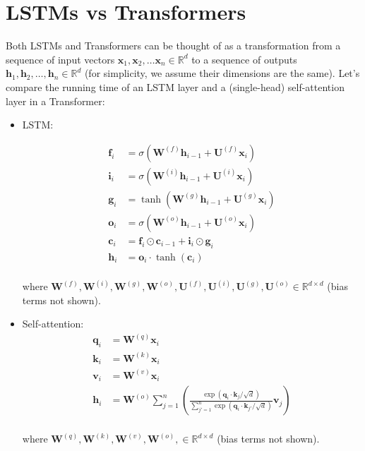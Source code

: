 \documentclass[11pt, letterpaper]{article}
\begin{document}
\newpage

\section{LSTMs vs Transformers}

Both LSTMs and Transformers can be thought of as a transformation from a sequence of input vectors $\textbf{x}_1, \textbf{x}_2, \dots \textbf{x}_n \in \mathbb{R}^d$ to a sequence of outputs $\textbf{h}_1, \textbf{h}_2, \dots, \textbf{h}_n \in \mathbb{R}^d$ (for simplicity, we assume their dimensions are the same). Let's compare the running time of an LSTM layer and a (single-head) self-attention layer in a Transformer:

\begin{itemize}
    \item LSTM:

    $$\begin{aligned}
        \mathbf{f}_i &= \sigma(\mathbf{W}^{(f)}\mathbf{h}_{i-1} + \mathbf{U}^{(f)}\mathbf{x}_i)\\
        \mathbf{i}_i &= \sigma(\mathbf{W}^{(i)}\mathbf{h}_{i-1} + \mathbf{U}^{(i)}\mathbf{x}_i)\\
        \mathbf{g}_i &= \tanh(\mathbf{W}^{(g)}\mathbf{h}_{i-1} + \mathbf{U}^{(g)}\mathbf{x}_i)\\
        \mathbf{o}_i &= \sigma(\mathbf{W}^{(o)}\mathbf{h}_{i-1} + \mathbf{U}^{(o)}\mathbf{x}_i)\\
        \mathbf{c}_i &= \mathbf{f}_i \odot \mathbf{c}_{i-1} + \mathbf{i}_i \odot \mathbf{g}_i\\
        \mathbf{h}_i &= \mathbf{o}_i \cdot \tanh(\mathbf{c}_i)\\
    \end{aligned}$$

    where $\mathbf{W}^{(f)},\mathbf{W}^{(i)},\mathbf{W}^{(g)},\mathbf{W}^{(o)},\mathbf{U}^{(f)},\mathbf{U}^{(i)},\mathbf{U}^{(g)},\mathbf{U}^{(o)}\in\mathbb{R}^{d\times d}$ (bias terms not shown).

    \item Self-attention:
        $$\begin{aligned}
            \mathbf{q}_i &= \mathbf{W}^{(q)}\mathbf{x}_i\\
            \mathbf{k}_i &= \mathbf{W}^{(k)}\mathbf{x}_i\\
            \mathbf{v}_i &= \mathbf{W}^{(v)}\mathbf{x}_i\\
            \mathbf{h}_i &= \mathbf{W}^{(o)} \sum_{j=1}^n \left(\frac{\exp(\mathbf{q}_i\cdot \mathbf{k}_j / \sqrt{d})}{\sum_{j'=1}^n\exp(\mathbf{q}_i\cdot \mathbf{k}_{j'} / \sqrt{d})} \mathbf{v}_j\right) \\
        \end{aligned}$$

        where $\mathbf{W}^{(q)},\mathbf{W}^{(k)},\mathbf{W}^{(v)},\mathbf{W}^{(o)},\in\mathbb{R}^{d\times d}$ (bias terms not shown).
\end{itemize}
\end{document}
